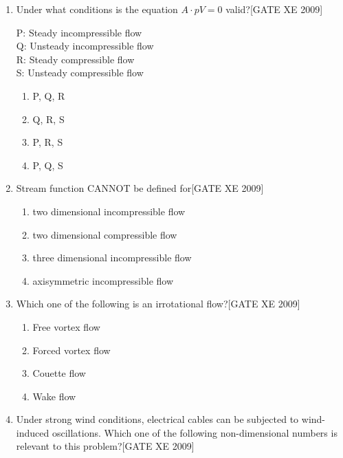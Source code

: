 \documentclass[journal,12pt,onecolumn]{IEEEtran}
\theoremstyle{remark}
\begin{document}
\begin{enumerate}
\item Under what conditions is the equation $A \cdot pV = 0$ valid?\hfill[GATE XE 2009] 

P: Steady incompressible flow \\
Q: Unsteady incompressible flow \\
R: Steady compressible flow \\
S: Unsteady compressible flow \\
\begin{multicols}{4}
\begin{enumerate}
    \item  P, Q, R
    \item  Q, R, S
    \item  P, R, S\
    \item  P, Q, S
\end{enumerate}
  \end{multicols}


\item Stream function CANNOT be defined for\hfill[GATE XE 2009]
\begin{multicols}{2}
\begin{enumerate}
    

   \item  two dimensional incompressible flow 
 \item  two dimensional compressible flow 
    \item  three dimensional incompressible flow 
   \item  axisymmetric incompressible flow 
\end{enumerate}
 \end{multicols}

\item Which one of the following is an irrotational flow?\hfill[GATE XE 2009]
\begin{enumerate}
    \item Free vortex flow
    \item Forced vortex flow
    \item Couette flow
    \item Wake flow
\end{enumerate}

\item Under strong wind conditions, electrical cables can be subjected to wind-induced oscillations. Which one of the following non-dimensional numbers is relevant to this problem?\hfill[GATE XE 2009]

\begin{multicols}{2}
\begin{enumerate}
       



\end{enumerate}
\end{multicols}
\end{enumerate}
\end{document}
